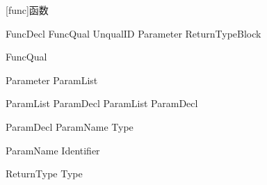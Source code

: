 
[func]{函数}

\begin{bnf}{FuncDecl}
    FuncQual\bnfs {} UnqualID Parameter ReturnType\bnfq Block
\end{bnf}

\begin{bnf}{FuncQual}
     \br
     \br
\end{bnf}

\begin{bnf}{Parameter}
    \terminal{(} ParamList\bnfq \terminal{)}
\end{bnf}

\begin{bnf}{ParamList}
    ParamDecl \br
    ParamList \terminal{,} ParamDecl
\end{bnf}

\begin{bnf}{ParamDecl}
    ParamName \terminal{:} Type\bnfq
\end{bnf}

\begin{bnf}{ParamName}
    Identifier \br
\end{bnf}

\begin{bnf}{ReturnType}
    \terminal{->} Type
\end{bnf}